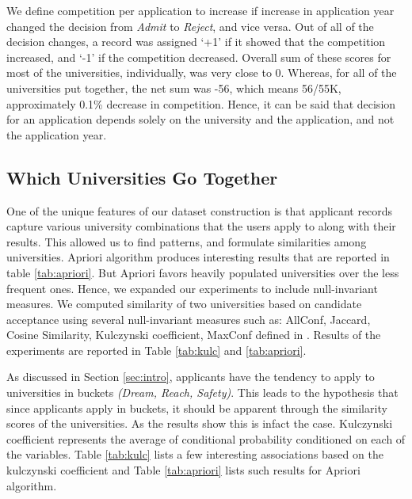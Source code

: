 \documentclass{sig-alternate-05-2015}
\begin{document}
We define competition per application to increase if increase in application year changed the decision from \textit{Admit} to \textit{Reject}, and vice versa. Out of all of the decision changes, a record was assigned `+1' if it showed that the competition increased, and `-1' if the competition decreased. Overall sum of these scores for most of the universities, individually, was very close to 0. Whereas, for all of the universities put together, the net sum was -56, which means 56/55K, approximately 0.1\% decrease in competition. Hence, it can be said that decision for an application depends solely on the university and the application, and not the application year.


\subsection{Which Universities Go Together}
\label{subsec:similarity-exp}
One of the unique features of our dataset construction is that applicant records capture various university combinations that the users apply to along with their results. This allowed us to find patterns, and formulate similarities among universities. Apriori algorithm \cite{apriori} produces interesting results that are reported in table \ref{tab:apriori}. But Apriori favors heavily populated universities over the less frequent ones. Hence, we expanded our experiments to include null-invariant measures. We computed similarity of two universities based on candidate acceptance using several null-invariant measures such as: AllConf, Jaccard, Cosine Similarity, Kulczynski coefficient, MaxConf defined in \cite{Han2012243}.
Results of the experiments are reported in Table \ref{tab:kulc} and \ref{tab:apriori}.

As discussed in Section \ref{sec:intro}, applicants have the tendency to apply to universities in buckets \textit{(Dream, Reach, Safety)}. This leads to the hypothesis that since applicants apply in buckets, it should be apparent through the similarity scores of the universities. As the results show this is infact the case. Kulczynski coefficient represents the average of conditional probability conditioned on each of the variables. Table \ref{tab:kulc} lists a few interesting associations based on the kulczynski coefficient and Table \ref{tab:apriori} lists such results for Apriori algorithm.
\end{document}
